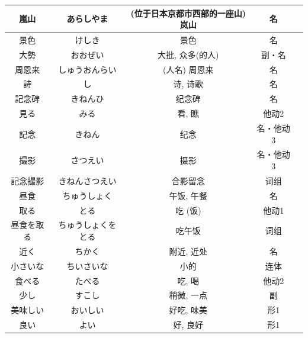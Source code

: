 \begin{longtable}{|c|c|c|c|c|}
嵐山 & あらしやま & (位于日本京都市西部的一座山) 岚山 & 名 & \\ \hline
景色 & けしき & 景色 & 名 & \\ \hline
大勢 & おおぜい & 大批, 众多(的人) & 副・名 & \\ \hline
周恩来 & しゅうおんらい & (人名) 周恩来 & 名 & \\ \hline
詩 & し & 诗, 诗歌 & 名 & \\ \hline
記念碑 & きねんひ & 纪念碑 & 名 & \\ \hline
見る & みる & 看, 瞧 & 他动2 & \\ \hline
記念 & きねん & 纪念 & 名・他动3 & \\ \hline
撮影 & さつえい & 摄影 & 名・他动3 & \\ \hline
記念撮影 & きねんさつえい & 合影留念 & 词组 & \\ \hline
昼食 & ちゅうしょく & 午饭, 午餐 & 名 & \\ \hline
取る & とる & 吃 (饭) & 他动1 & \\ \hline
昼食を取る & ちゅうしょくをとる & 吃午饭 & 词组 & \\ \hline
近く & ちかく & 附近, 近处 & 名 & \\ \hline
小さいな & ちいさいな & 小的 & 连体 & \\ \hline
食べる & たべる & 吃, 喝 & 他动2 & \\ \hline
少し & すこし & 稍微, 一点 & 副 & \\ \hline
美味しい & おいしい & 好吃, 味美 & 形1 & \\ \hline
良い & よい & 好, 良好 & 形1 & \\ \hline
\end{longtable}
